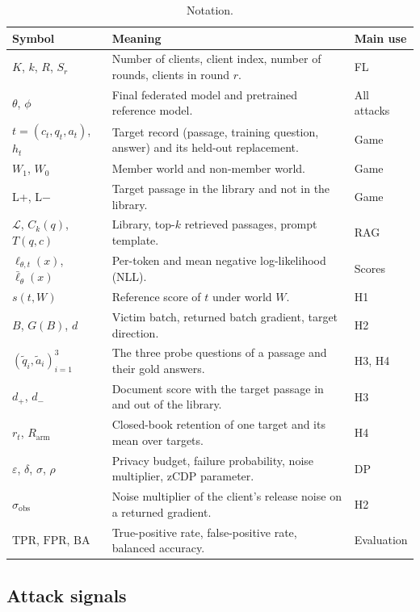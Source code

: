 \documentclass[11pt]{article}
\begin{document}
\begin{table}[tbp]
\centering
\small
\caption{Notation.}\label{tab:notation}
\begin{tabular}{@{}L{0.20\textwidth}L{0.55\textwidth}L{0.18\textwidth}@{}}
\toprule
Symbol & Meaning & Main use \\
\midrule
$K$, $k$, $R$, $S_r$ & Number of clients, client index, number of rounds, clients in round $r$. & FL \\
$\theta$, $\phi$ & Final federated model and pretrained reference model. & All attacks \\
$t=(c_t,q_t,a_t)$, $h_t$ & Target record (passage, training question, answer) and its held-out replacement. & Game \\
$W_1$, $W_0$ & Member world and non-member world. & Game \\
L+, L$-$ & Target passage in the library and not in the library. & Game \\
$\mathcal L$, $C_k(q)$, $T(q,c)$ & Library, top-$k$ retrieved passages, prompt template. & RAG \\
$\ell_{\theta,t}(x)$, $\bar\ell_\theta(x)$ & Per-token and mean negative log-likelihood (NLL). & Scores \\
$s(t,W)$ & Reference score of $t$ under world $W$. & H1 \\
$B$, $G(B)$, $d$ & Victim batch, returned batch gradient, target direction. & H2 \\
$(\tilde q_i,\tilde a_i)_{i=1}^{3}$ & The three probe questions of a passage and their gold answers. & H3, H4 \\
$d_{+}$, $d_{-}$ & Document score with the target passage in and out of the library. & H3 \\
$r_t$, $R_{\mathrm{arm}}$ & Closed-book retention of one target and its mean over targets. & H4 \\
$\varepsilon$, $\delta$, $\sigma$, $\rho$ & Privacy budget, failure probability, noise multiplier, zCDP parameter. & DP \\
$\sigma_{\mathrm{obs}}$ & Noise multiplier of the client's release noise on a returned gradient. & H2 \\
$\mathrm{TPR}$, $\mathrm{FPR}$, $\mathrm{BA}$ & True-positive rate, false-positive rate, balanced accuracy. & Evaluation \\
\bottomrule
\end{tabular}
\end{table}

\subsection{Attack signals}\label{sec:signals}
\end{document}
